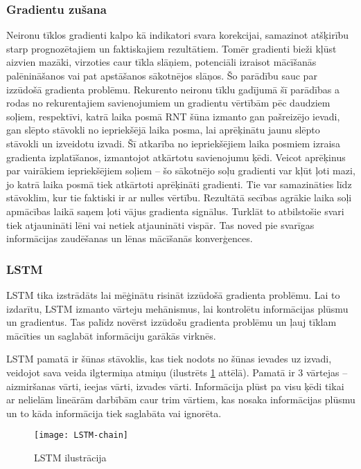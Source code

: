 \subsubsection{Gradientu zušana}
Neironu tīklos gradienti kalpo kā indikatori svara korekcijai, samazinot atšķirību starp prognozētajiem un faktiskajiem rezultātiem. Tomēr gradienti bieži kļūst aizvien mazāki, virzoties caur tīkla slāņiem, potenciāli izraisot mācīšanās palēnināšanos vai pat apstāšanos sākotnējos slāņos. Šo parādību sauc par izzūdošā gradienta problēmu. Rekurento neironu tīklu gadījumā šī parādības a rodas no rekurentajiem savienojumiem un gradientu vērtībām pēc daudziem soļiem, respektīvi, katrā laika posmā RNT šūna izmanto gan pašreizējo ievadi, gan slēpto stāvokli no iepriekšējā laika posma, lai aprēķinātu jaunu slēpto stāvokli un izveidotu izvadi. Šī atkarība no iepriekšējiem laika posmiem izraisa gradienta izplatīšanos, izmantojot atkārtotu savienojumu ķēdi. Veicot aprēķinus par vairākiem iepriekšējiem soļiem – šo sākotnējo soļu gradienti var kļūt ļoti mazi, jo katrā laika posmā tiek atkārtoti aprēķināti gradienti. Tie var samazināties līdz stāvoklim, kur tie faktiski ir ar nulles vērtību. Rezultātā secības agrākie laika soļi apmācības laikā saņem ļoti vājus gradienta signālus. Turklāt to atbilstošie svari tiek atjaunināti lēni vai netiek atjaunināti vispār. Tas noved pie svarīgas informācijas zaudēšanas un lēnas mācīšanās konverģences.

\subsubsection{LSTM}
LSTM tika izstrādāts lai mēģinātu risināt izzūdošā gradienta problēmu. Lai to izdarītu, LSTM izmanto vārteju mehānismus, lai kontrolētu informācijas plūsmu un gradientus. Tas palīdz novērst izzūdošu gradienta problēmu un ļauj tīklam mācīties un saglabāt informāciju garākās virknēs.

LSTM pamatā ir šūnas stāvoklis, kas tiek nodots no šūnas ievades uz izvadi, veidojot sava veida ilgtermiņa atmiņu (ilustrēts \ref{fig:LSTM-chain} attēlā). Pamatā ir 3 vārtejas – aizmiršanas vārti, ieejas vārti, izvades vārti. Informācija plūst pa visu ķēdi tikai ar nelielām lineārām darbībām caur trim vārtiem, kas nosaka informācijas plūsmu un to kāda informācija tiek saglabāta vai ignorēta.

\begin{figure}[H]
\texttt{[image: LSTM-chain]}
\caption{LSTM ilustrācija \cite{ChristopherOlahLSTM}}
\label{fig:LSTM-chain}
\end{figure}

